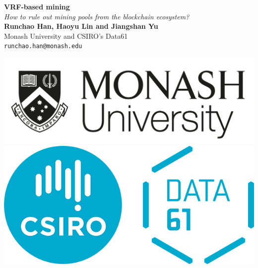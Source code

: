 \documentclass[a0,portrait]{a0poster}
\begin{document}


\begin{minipage}[b]{0.75\linewidth}
    \veryHuge \color{NavyBlue} \textbf{VRF-based mining} \color{Black}\\ %
    \Huge\textit{How to rule out mining pools from the blockchain ecosystem?}\\[2cm] %
    \huge \textbf{Runchao Han, Haoyu Lin and Jiangshan Yu}\\[0.5cm] %
    \huge Monash University and CSIRO's Data61\\[0.4cm] %
    \Large \texttt{runchao.han@monash.edu}\\
\end{minipage}
%
\begin{minipage}[b]{0.25\linewidth}
    \includegraphics[width=18cm]{monash-logo.jpg}\\
    \includegraphics[width=18cm]{data61-logo.png}
\end{minipage}
\end{document}
